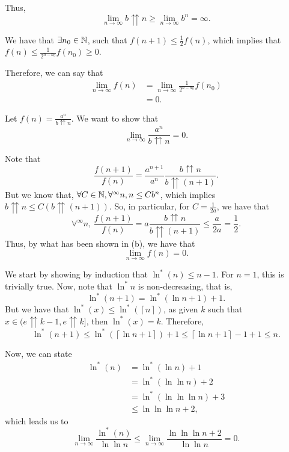 Thus, \[
\lim_{n \to \infty} b\upuparrows n \ge \lim_{n \to \infty} b^{n} = \infty
.\] 


We have that $\exists n_0\in \mathbb{N}$, such that $f(n+1) \le \frac{1}{2}f(n)$, which implies that $f(n) \le \frac{1}{2^{n-n_0}} f(n_0)\ge 0$.

Therefore, we can say that
\begin{align*}
    \lim_{n \to \infty} f(n) &=  \lim_{n \to \infty} \frac{1}{2^{n-n_0}}f(n_0) \\
    &= 0
.\end{align*}


Let $f(n) = \frac{a^{n}}{b\upuparrows n}$.
We want to show that \[
    \lim_{n \to \infty} \frac{a^{n}}{b\upuparrows n} = 0
.\] 

Note that \[
    \frac{f(n+1)}{f(n)} = \frac{a^{n+1}}{a^{n}} \frac{b\upuparrows n}{b\upuparrows (n+1)}
.\] But we know that, $\forall C\in \mathbb{N}, \forall^{\infty}n, n\le C b^{n}$, which implies $b\upuparrows n\le C (b\upuparrows (n+1))$.
So, in particular, for $C=\frac{1}{2a}$, we have that \[
\forall^{\infty}n,\, \frac{f(n+1)}{f(n)} = a\frac{b\upuparrows n}{b\upuparrows (n+1)} \le \frac{a}{2a} = \frac{1}{2}
.\] 
Thus, by what has been shown in (b), we have that \[
\lim_{n \to \infty} f(n) = 0 
.\] 


We start by showing by induction that $\ln^{*}(n) \le n-1$.
For $n=1$, this is trivially true.
Now, note that $\ln^{*} n$ is non-decreasing, that is, \[
\ln^{*}(n+1) = \ln^{*}(\ln n+1) + 1
.\] But we have that $\ln^{*}(x) \le \ln^{*}\left( \left\lceil n \right\rceil  \right) $, as given $k$ such that $x\in (e\upuparrows k-1,e\upuparrows k]$, then $\ln^{*}(x) = k$.
Therefore, \[
\ln^{*}(n+1) \le \ln^{*}(\left\lceil \ln n+1 \right\rceil) +1 \le \left\lceil \ln n+1 \right\rceil -1 +1 \le n
.\] 

Now, we can state
\begin{align*}
    \ln^{*}(n) &= \ln^{*}(\ln n) + 1 \\
    &= \ln^{*}(\ln \ln n) + 2 \\
    &= \ln^{*}(\ln \ln \ln n) + 3 \\
    &\le \ln \ln \ln n + 2
,\end{align*}
which leads us to \[
\lim_{n \to \infty} \frac{\ln^{*}(n)}{\ln \ln n} \le  \lim_{n \to \infty} \frac{\ln \ln \ln n +2}{\ln \ln n} = 0
.\] 

